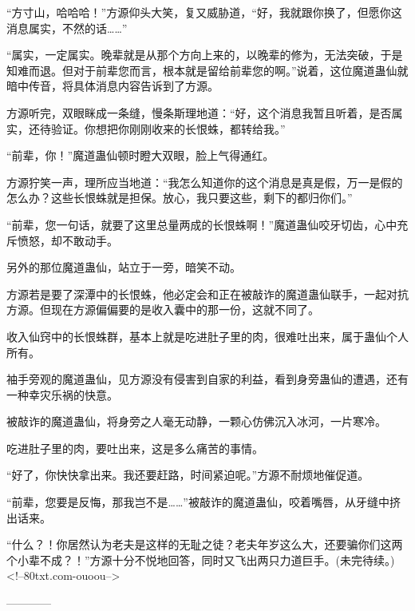 \begin{this_body}
“方寸山，哈哈哈！”方源仰头大笑，复又威胁道，“好，我就跟你换了，但愿你这消息属实，不然的话……”

“属实，一定属实。晚辈就是从那个方向上来的，以晚辈的修为，无法突破，于是知难而退。但对于前辈您而言，根本就是留给前辈您的啊。”说着，这位魔道蛊仙就暗中传音，将具体消息内容告诉到了方源。

方源听完，双眼眯成一条缝，慢条斯理地道：“好，这个消息我暂且听着，是否属实，还待验证。你想把你刚刚收来的长恨蛛，都转给我。”

“前辈，你！”魔道蛊仙顿时瞪大双眼，脸上气得通红。

方源狞笑一声，理所应当地道：“我怎么知道你的这个消息是真是假，万一是假的怎么办？这些长恨蛛就是担保。放心，我只要这些，剩下的都归你们。”

“前辈，您一句话，就要了这里总量两成的长恨蛛啊！”魔道蛊仙咬牙切齿，心中充斥愤怒，却不敢动手。

另外的那位魔道蛊仙，站立于一旁，暗笑不动。

方源若是要了深潭中的长恨蛛，他必定会和正在被敲诈的魔道蛊仙联手，一起对抗方源。但现在方源偏偏要的是收入囊中的那一份，这就不同了。

收入仙窍中的长恨蛛群，基本上就是吃进肚子里的肉，很难吐出来，属于蛊仙个人所有。

袖手旁观的魔道蛊仙，见方源没有侵害到自家的利益，看到身旁蛊仙的遭遇，还有一种幸灾乐祸的快意。

被敲诈的魔道蛊仙，将身旁之人毫无动静，一颗心仿佛沉入冰河，一片寒冷。

吃进肚子里的肉，要吐出来，这是多么痛苦的事情。

“好了，你快快拿出来。我还要赶路，时间紧迫呢。”方源不耐烦地催促道。

“前辈，您要是反悔，那我岂不是……”被敲诈的魔道蛊仙，咬着嘴唇，从牙缝中挤出话来。

“什么？！你居然认为老夫是这样的无耻之徒？老夫年岁这么大，还要骗你们这两个小辈不成？！”方源十分不悦地回答，同时又飞出两只力道巨手。(未完待续。)<!--80txt.com-ouoou-->

------------

\end{this_body}

